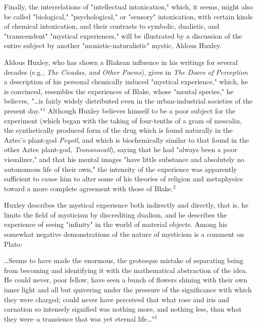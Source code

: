 Finally, the interrelations of "intellectual intoxication,"
which, it seems, might also be called "biological," "psychological,"
or "sensory" intoxication, with certain kinds of chemical intoxication,
and their contrasts to symbolic, dualistic, and "transcendent" "mystical
experiences," will be illustrated by a discussion of the entire
subject by another "monistic-naturalistic" mystic, Aldous Huxley.\par
\vspace*{0.5\baselineskip}
Aldous Huxley, who has shown a Blakean influence in his
writings for several decades (e.g., \textit{The Cicadas, and Other Poems}), gives
in \textit{The Doors of Perception} a description of his
personal chemically induced "mystical experience," which, he
is convinced, resembles the experiences of Blake, whose
"mental species," he believes, "\dots is fairly widely distributed
even in the urban-industrial societies of the present day."$^{1}$
Although Huxley believes himself to be a poor subject for the experiment
(which began with the taking of four-tenths of a gram of mescalin, the synthetically produced
form of the drug which is found naturally in the Aztec's plant-god \textit{Peyotl},
and which is biochemically similar to that found in the other
Aztec plant-god, \textit{Teonanacatl}), saying that he had "always been
a poor visualizer," and that his mental images "have little
substance and absolutely no autonomous life of their own,"
the intensity of the experience was apparently sufficient to
cause him to alter some of his theories of religion and metaphysics
toward a more complete agreement with those of Blake.$^{2}$\par
\vspace*{0.5\baselineskip}
Huxley describes the mystical experience both indirectly
and directly, that is, he limits the field of mysticism by
discrediting dualism, and he describes the experience of
seeing "infinity" in the world of material objects. Among
his somewhat negative demonstrations of the nature of mysticism
is a comment on Plato:\par
\begin{center}
	\parbox{0.8\textwidth}{
		\hspace*{5mm}\dots Seems to have made the enormous, the grotesque mistake
		of separating being from becoming and identifying it with
		the mathematical abstraction of the idea. He could never,
		poor fellow, have seen a bunch of flowers shining with their
		own inner light and all but quivering under the pressure of
		the significance with which they were charged; could never
		have perceived that what rose and iris and carnation so
		intensely signified was nothing more, and nothing less,
		than what they were--a transience that was yet eternal life\dots"$^{3}$\par
	}%
\end{center}
